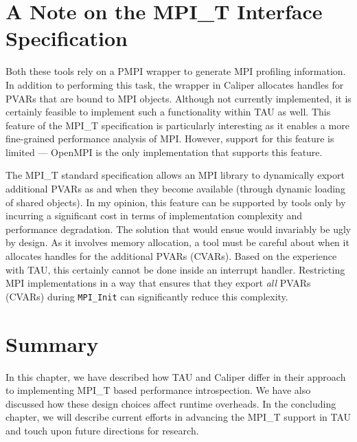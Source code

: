 \section{A Note on the MPI\_T Interface Specification}
\par Both these tools rely on a PMPI wrapper to generate MPI profiling information. In addition to performing this task, the wrapper in Caliper allocates handles for PVARs that are bound to MPI objects. Although not currently implemented, it is certainly feasible to implement such a functionality within TAU as well. This feature of the MPI\_T specification is particularly interesting as it enables a more fine-grained performance analysis of MPI. However, support for this feature is limited --- OpenMPI is the only implementation that supports this feature. 
\par The MPI\_T standard specification allows an MPI library to dynamically export additional PVARs as and when they become available (through dynamic loading of shared objects). In my opinion, this feature can be supported by tools only by incurring a significant cost in terms of implementation complexity and performance degradation. The solution that would ensue would invariably be ugly by design. As it involves memory allocation, a tool must be careful about when it allocates handles for the additional PVARs (CVARs). Based on the experience with TAU, this certainly cannot be done inside an interrupt handler. Restricting MPI implementations in a way that ensures that they export \textit{all} PVARs (CVARs) during \verb+MPI_Init+ can significantly reduce this complexity. 
\section{Summary}
In this chapter, we have described how TAU and Caliper differ in their approach to implementing MPI\_T based performance introspection. We have also discussed how these design choices affect runtime overheads. In the concluding chapter, we will describe current efforts in advancing the MPI\_T support in TAU and touch upon future directions for research.
